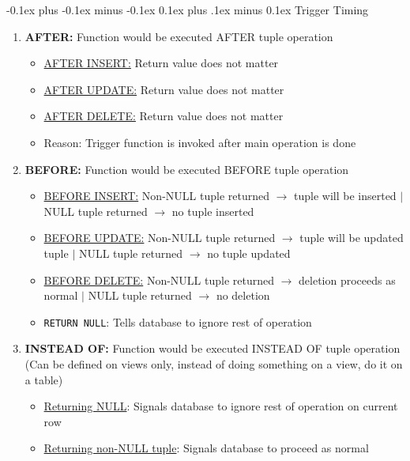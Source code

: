 \documentclass[landscape]{article}
\makeatletter
\renewcommand{\subsection}{\@startsection{subsection}{2}{0mm}%
  {-0.1ex plus -0.1ex minus -0.1ex}%
  {0.1ex plus .1ex minus 0.1ex}%
{\normalfont\scriptsize\bfseries}}
\makeatother
\begin{document}
\begin{multicols*}{5}
    \subsection{Trigger Timing}
    \begin{enumerate}
      \item \textbf{AFTER:} Function would be executed AFTER tuple operation
      \begin{itemize}
        \item \underline{AFTER INSERT:} Return value does not matter
        \item \underline{AFTER UPDATE:} Return value does not matter
        \item \underline{AFTER DELETE:} Return value does not matter
        \item Reason: Trigger function is invoked after main operation is done
      \end{itemize}
      \item \textbf{BEFORE:} Function would be executed BEFORE tuple operation
      \begin{itemize}
        \item \underline{BEFORE INSERT:} Non-NULL tuple returned $\rightarrow$ tuple will be inserted $\vert$ NULL tuple returned $\rightarrow$ no tuple inserted
        \item \underline{BEFORE UPDATE:} Non-NULL tuple returned $\rightarrow$ tuple will be updated tuple $\vert$ NULL tuple returned $\rightarrow$ no tuple updated
        \item \underline{BEFORE DELETE:} Non-NULL tuple returned $\rightarrow$ deletion proceeds as normal $\vert$ NULL tuple returned $\rightarrow$ no deletion
        \item \verb|RETURN NULL|: Tells database to ignore rest of operation
      \end{itemize}
      \item \textbf{INSTEAD OF:} Function would be executed INSTEAD OF tuple operation (Can be defined on views only, instead of doing something on a view, do it on a table)
      \begin{itemize}
        \item \underline{Returning NULL}: Signals database to ignore rest of operation on current row
        \item \underline{Returning non-NULL tuple}: Signals database to proceed as normal
      \end{itemize}
    \end{enumerate}


\end{multicols*}
\end{document}
